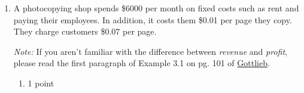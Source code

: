 \documentclass{article}
\begin{document}
\begin{enumerate}
\begin{enumerate}
  \item
    \begin{problem}[\nstretch{0.75}]
      The line $\mathcal{L}$ shown below. (Express your answer
      in terms of $f$, $a$, and $b$.)

    \end{problem}

    \begin{solution}
      We can write down the coordinates of two points on the line: $(a, f(a))$ and $(b, f(b))$.
      We can write down the equation of the line in point-slope form as
      \[\boxed{y-f(a)=\frac{f(b)-f(a)}{b-a}(x-a).}\]
    \end{solution}

  \end{enumerate}

\item %

  A photocopying shop spends \$6000 per month on fixed costs such as
  rent and paying their employees. In addition, it costs them \$0.01
  per page they copy. They charge customers \$0.07 per page.

  \emph{Note:} If you aren't familiar with the difference between \emph{revenue} and \emph{profit}, please read the first paragraph of Example 3.1 on pg. 101 of \href{https://people.math.harvard.edu/~jjchen/mathma/docs/handouts/Gottlieb.html}{Gottlieb}.

  \begin{enumerate}

  \item

    \begin{grading}
      1 point
    \end{grading}


\end{enumerate}
\end{enumerate}
\end{document}
